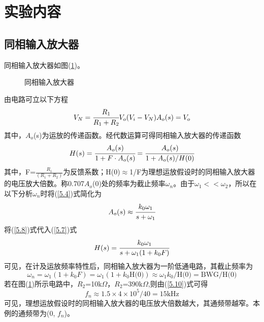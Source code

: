 \documentclass[a4paper]{article}
\begin{document}
\section{实验内容}
\subsection{同相输入放大器}
同相输入放大器如图(\ref{cdtxfdq})。
\begin{figure}[!h]
\centering
{}
\caption{同相输入放大器}\label{cdtxfdq}
\end{figure}
由电路可立以下方程
\begin{equation}
V_N = \cfrac{R_1}{R_1+R_2}V_o\\
(V_i - V_N)A_o(s) = V_o\label{5.6}
\end{equation}
其中，$A_o$(s)为运放的传递函数。经代数运算可得同相输入放大器的传递函数
\begin{equation}
H(s) = \cfrac{A_o(s)}{1+F\cdot A_o(s)} = \cfrac{A_o(s)}{1+A_o(s)/H(0)}\label{5.7}
\end{equation}
其中，F=$\frac{R_1}{(R_1+R_2)}$为反馈系数；H(0)$\approx$1/F为理想运放假设时的同相输入放大器的电压放大倍数。称0.707$A_o$(0)处的频率为截止频率$\omega_n$。由于$\omega_1 << \omega_2$，所以在以下分析$\omega_n$时将(\ref{5.4})式简化为
\begin{equation}
A_o(s) \approx \cfrac{k_0\omega_1}{s+\omega_1}\label{5.8}
\end{equation}
将(\ref{5.8})式代入(\ref{5.7})式
\begin{equation}
H(s) = \cfrac{k_0\omega_1}{s+\omega_1(1+k_0F)}\label{5.9}
\end{equation}
可见，在计及运放频率特性后，同相输入放大器为一阶低通电路，其截止频率为
\begin{equation}
\omega_n = \omega_1(1+k_0F) = \omega_1(1+k_0\text{H(0)}) \approx \omega_1k_0\text{/H(0)} = \text{BWG/H(0)}\label{5.10}
\end{equation}
若在图(\ref{cdtxfdq})所示电路中，$R_2$=10k$\Omega$，$R_2$=390k$\Omega$,则由(\ref{5.10})式可得
\begin{equation}
f_n \approx 1.5\times 4\times 10^5/40 = 15\text{kHz}\label{5.11}
\end{equation}
可见，理想运放假设时的同相输入放大器的电压放大倍数越大，其通频带越窄。本例的通频带为(0, $f_n$)。%
\end{document}
